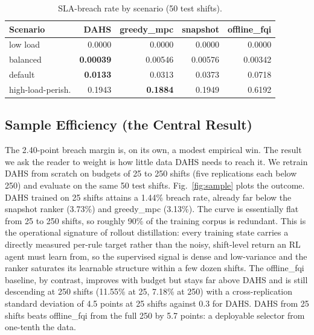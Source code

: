 \documentclass[conference]{IEEEtran}
\begin{document}
\begin{table}[t]
\centering
\caption{SLA-breach rate by scenario (50 test shifts).}
\label{tab:scenario}
\begin{tabular}{lrrrr}
\toprule
Scenario & DAHS & greedy\_mpc & snapshot & offline\_fqi \\
\midrule
low load             & 0.0000          & 0.0000          & 0.0000 & 0.0000 \\
balanced             & \textbf{0.00039} & 0.00546        & 0.00576 & 0.00342 \\
default              & \textbf{0.0133} & 0.0313          & 0.0373 & 0.0718 \\
high-load-perish.    & 0.1943          & \textbf{0.1884} & 0.1949 & 0.6192 \\
\bottomrule
\end{tabular}
\end{table}

\subsection{Sample Efficiency (the Central Result)}
\label{sec:sample}

The 2.40-point breach margin is, on its own, a modest empirical win. The result we
ask the reader to weight is how little data DAHS needs to reach it. We retrain DAHS
from scratch on budgets of 25 to 250 shifts (five replications each below 250) and
evaluate on the same 50 test shifts. Fig.~\ref{fig:sample} plots the outcome. DAHS
trained on 25 shifts attains a 1.44\% breach rate, already far below the snapshot
ranker (3.73\%) and greedy\_mpc (3.13\%). The curve is essentially flat from 25 to
250 shifts, so roughly 90\% of the training corpus is redundant. This is the
operational signature of rollout distillation: every training state carries a
directly measured per-rule target rather than the noisy, shift-level return an RL
agent must learn from, so the supervised signal is dense and low-variance and the
ranker saturates its learnable structure within a few dozen shifts. The
offline\_fqi baseline, by contrast, improves with budget but stays far above DAHS
and is still descending at 250 shifts (11.55\% at 25, 7.18\% at 250) with a
cross-replication standard deviation of 4.5 points at 25 shifts against 0.3 for
DAHS. DAHS from 25 shifts beats offline\_fqi from the full 250 by 5.7 points: a
deployable selector from one-tenth the data.
\end{document}
